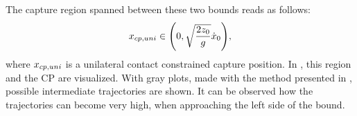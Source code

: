 
The capture region spanned between these two bounds reads as follows:
\begin{equation}
x_{cp,uni} \in \Bigg(0, \sqrt{\frac{2z_0}{g}}\dot{x}_0 \Bigg),
\label{eq:xcpuni}
\end{equation}
where $x_{cp,uni}$ is a unilateral contact constrained capture position. In , this region and the \ac{CP} are visualized. With gray plots, made with the method presented in \cite{koolen2016balance}, possible intermediate trajectories are shown. It can be observed how the trajectories can become very high, when approaching the left side of the bound.  

